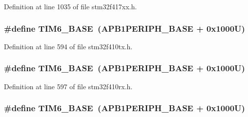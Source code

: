 Definition at line 1035 of file stm32f417xx.\+h.

\subsubsection[{\texorpdfstring{T\+I\+M6\+\_\+\+B\+A\+SE}{TIM6_BASE}}]{\setlength{\rightskip}{0pt plus 5cm}\#define T\+I\+M6\+\_\+\+B\+A\+SE~({\bf A\+P\+B1\+P\+E\+R\+I\+P\+H\+\_\+\+B\+A\+SE} + 0x1000\+U)}\hypertarget{group___peripheral__registers__structures_ga8268ec947929f192559f28c6bf7d1eac}{}\label{group___peripheral__registers__structures_ga8268ec947929f192559f28c6bf7d1eac}


Definition at line 594 of file stm32f410tx.\+h.

\subsubsection[{\texorpdfstring{T\+I\+M6\+\_\+\+B\+A\+SE}{TIM6_BASE}}]{\setlength{\rightskip}{0pt plus 5cm}\#define T\+I\+M6\+\_\+\+B\+A\+SE~({\bf A\+P\+B1\+P\+E\+R\+I\+P\+H\+\_\+\+B\+A\+SE} + 0x1000\+U)}\hypertarget{group___peripheral__registers__structures_ga8268ec947929f192559f28c6bf7d1eac}{}\label{group___peripheral__registers__structures_ga8268ec947929f192559f28c6bf7d1eac}


Definition at line 597 of file stm32f410rx.\+h.

\subsubsection[{\texorpdfstring{T\+I\+M6\+\_\+\+B\+A\+SE}{TIM6_BASE}}]{\setlength{\rightskip}{0pt plus 5cm}\#define T\+I\+M6\+\_\+\+B\+A\+SE~({\bf A\+P\+B1\+P\+E\+R\+I\+P\+H\+\_\+\+B\+A\+SE} + 0x1000\+U)}\hypertarget{group___peripheral__registers__structures_ga8268ec947929f192559f28c6bf7d1eac}{}\label{group___peripheral__registers__structures_ga8268ec947929f192559f28c6bf7d1eac}


